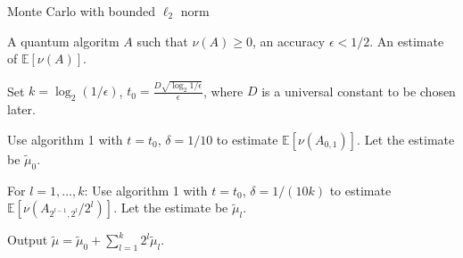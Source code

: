 \documentclass{article}
\begin{document}
\pagestyle{empty}

\begin{algorithm}[ht]
	\caption{Monte Carlo with bounded $\ell_2$ norm}
	\begin{algorithmic}[1]

		\Require  A quantum algoritm $A$ such that $\nu(A) \geq 0$, an accuracy $\epsilon< 1/2$.
		\Ensure An estimate of $\mathbb{E}[\nu(A)]$.
		\vspace{10pt}
		\Statex

		\State Set $k = \log_2(1/\epsilon)$, $t_0 =\frac{D\sqrt{\log_2{1/\epsilon}}}{\epsilon}$, where $D$ is a universal constant to be chosen later.

		\State Use algorithm 1 with $t=t_0$, $\delta = 1/10$ to estimate $\mathbb{E}[\nu(A_{0,1})]$. Let the estimate be $\widetilde{\mu}_0$.

		\State For $l = 1,\dots, k$:
		 Use algorithm 1 with $t=t_0$, $\delta = 1/(10k)$ to estimate $\mathbb{E}[\nu(A_{2^{l-1},2^l}/2^l)]$. Let the estimate be $\widetilde{\mu}_l$.

		\State Output $\widetilde{\mu} = \widetilde{\mu}_0 + \sum_{l=1}^k 2^l \widetilde{\mu}_l$.


	\end{algorithmic}
\end{algorithm}
\end{document}
